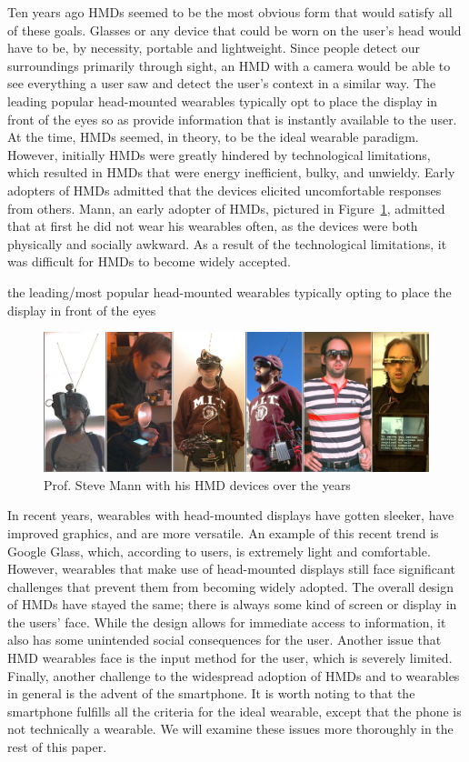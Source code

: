\documentclass[11pt]{article}
\begin{document}
Ten years ago HMDs seemed to be the most obvious form that would satisfy all of these goals. Glasses or any device that could be worn on the user's head would have to be, by necessity, portable and lightweight. Since people detect our surroundings primarily through sight, an HMD with a camera would be able to see everything a user saw and detect the user's context in a similar way. The leading popular head-mounted wearables typically opt to place the display in front of the eyes so as provide information that is instantly available to the user. At the time, HMDs seemed, in theory, to be the ideal wearable paradigm. However, initially HMDs were greatly hindered by technological limitations, which resulted in HMDs that were energy inefficient, bulky, and unwieldy\cite{fromCyborgsToGG}. Early adopters of HMDs admitted that the devices elicited uncomfortable responses from others. Mann, an early adopter of HMDs, pictured in Figure~\ref{fig:Mann}, admitted that at first he did not wear his wearables often, as the devices were both physically and socially awkward\cite{smartClothingShift}.  As a result of the technological limitations, it was difficult for HMDs to become widely accepted.  

the leading/most popular head-mounted wearables typically opting to place the display in front of the eyes

\begin{figure}[H] %
   \centering
   \includegraphics[width=5in]{Wearcompevolution2.jpg}       
   \caption{Prof. Steve Mann with his HMD devices over the years \cite{wearablesOverTime}}
   \label{fig:Mann}
\end{figure} 

In recent years, wearables with head-mounted displays have gotten sleeker, have improved graphics, and are more versatile. An example of this recent trend is Google Glass, which, according to users, is extremely light and comfortable. However, wearables that make use of head-mounted displays still face significant challenges that prevent them from becoming widely adopted. The overall design of HMDs have stayed the same; there is always some kind of screen or display in the users' face. While the design allows for immediate access to information, it also has some unintended social consequences for the user. Another issue that HMD wearables face is the input method for the user, which is severely limited. Finally, another challenge to the widespread adoption of HMDs and to wearables in general is the advent of the smartphone. It is worth noting to that the smartphone fulfills all the criteria for the ideal wearable, except that the phone is not technically a wearable. We will examine these issues more thoroughly in the rest of this paper.
\end{document}
